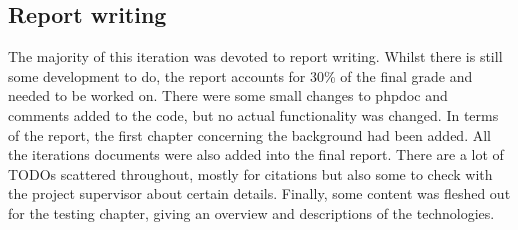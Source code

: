 \subsection{Report writing}
The majority of this iteration was devoted to report writing. Whilst there is still some development to do, the report accounts for 30\% of the final grade and needed to be worked on. There were some small changes to phpdoc and comments added to the code, but no actual functionality was changed. In terms of the report, the first chapter concerning the background had been added. All the iterations documents were also added into the final report. There are a lot of TODOs scattered throughout, mostly for citations but also some to check with the project supervisor about certain details. Finally, some content was fleshed out for the testing chapter, giving an overview and descriptions of the technologies.
\newpage